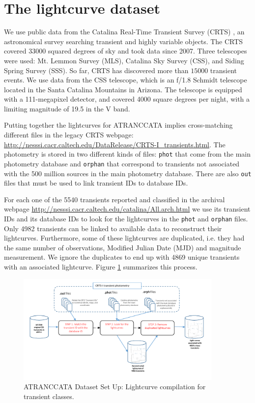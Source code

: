 \documentclass[usenatbib]{mnras}
\begin{document}
\section{The lightcurve dataset} 
\label{sec:data}

We use public data from the Catalina Real-Time Transient Survey
(CRTS) \citep{2009ApJ...696..870D}, an astronomical survey searching transient
and highly variable objects.
The CRTS covered 33000 squared degrees of sky and took data since 2007. 
Three telescopes were used: Mt. Lemmon Survey (MLS), Catalina Sky 
Survey (CSS), and Siding Spring Survey (SSS). So far, CRTS has 
discovered more than $15000$ transient events.
We use data from the CSS telescope, which is an f/1.8 Schmidt
telescope located in the Santa Catalina Mountains in Arizona.
The telescope is equipped with a 111-megapixel  detector, and covered
4000 square degrees per night, with a limiting magnitude of 19.5 in
the V band.  

Putting together the lightcurves for ATRANCCATA implies
cross-matching different files in the legacy CRTS webpage:
\url{http://nesssi.cacr.caltech.edu/DataRelease/CRTS-I_transients.html}. 
The photometry is stored in two different kinds of files: \verb"phot"
that come from the main photometry database and \verb"orphan" that
correspond to transients not associated with the 500 million sources
in the main photometry database.
There are also \verb"out" files that must be used to link transient
IDs to database IDs.


For each one of the 5540 transients reported and classified in the
archival webpage \url{http://nesssi.cacr.caltech.edu/catalina/All.arch.html} we use its
transient IDs and its database IDs to look for the lightcurves in the
\texttt{phot} and \texttt{orphan} files. 
Only 4982 transients can be linked to available data to reconstruct
their lightcurves. 
Furthermore, some of these lightcurves are duplicated, i.e. they had
the same number of observations, Modified Julian Date (MJD) and magnitude measurement. 
We ignore the duplicates to end up with 4869 unique transients with an 
associated lightcurve. Figure \ref{fig:transients} summarizes this process. 

\begin{figure}
	\includegraphics[width=0.9\textwidth]{Transients.pdf}
  \caption{ATRANCCATA Dataset Set Up: Lightcurve compilation for transient classes.}
  \label{fig:transients}
\end{figure} 
\end{document}
